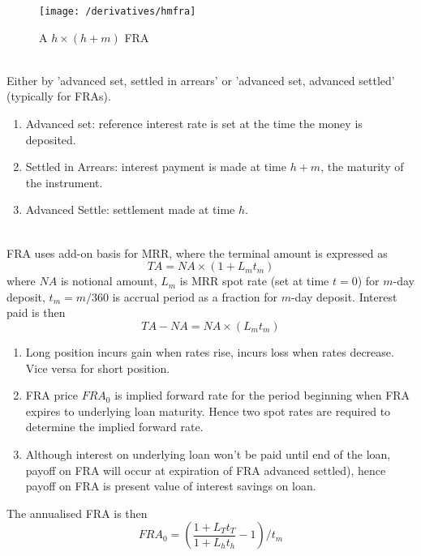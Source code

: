 \begin{figure}[H]
\centering
\texttt{[image: /derivatives/hmfra]}
\caption{A $h \times (h+m)$ FRA}
\end{figure}

\begin{remark} \\
Either by 'advanced set, settled in arrears' or 'advanced set, advanced settled' (typically for FRAs).
\begin{enumerate}[label=\roman*.]
\setlength{\itemsep}{0pt}
\item Advanced set: reference interest rate is set at the time the money is deposited.
\item Settled in Arrears: interest payment is made at time $h+m$, the maturity of the instrument.
\item Advanced Settle: settlement made at time $h$.
\end{enumerate}
\end{remark}

\begin{remark} \\
FRA uses add-on basis for MRR, where the terminal amount is expressed as
\begin{equation}
TA = NA \times (1 + L_m t_m) \nonumber
\end{equation}
where $NA$ is notional amount, $L_m$ is MRR spot rate (set at time $t=0$) for $m$-day deposit, $t_m = m/360$ is accrual period as a fraction for $m$-day deposit.
Interest paid is then
\begin{equation}
TA - NA = NA \times (L_m t_m) \nonumber
\end{equation}
\end{remark}

\begin{method} 
\begin{enumerate}[label=\roman*.]
\setlength{\itemsep}{0pt}
\item Long position incurs gain when rates rise, incurs loss when rates decrease. Vice versa for short position.
\item FRA price $FRA_0$ is implied forward rate for the period beginning when FRA expires to underlying loan maturity. Hence two spot rates are required to determine the implied forward rate.
\item Although interest on underlying loan won't be paid until end of the loan, payoff on FRA will occur at expiration of FRA advanced settled), hence payoff on FRA is present value of interest savings on loan.
\end{enumerate}
The annualised FRA is then
\begin{equation}
FRA_0 = \left(\frac{1 + L_T t_T}{1 + L_h t_h} - 1 \right)/t_m \nonumber
\end{equation}
\end{method}

